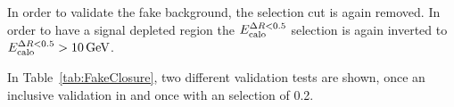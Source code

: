 In order to validate the fake background, the \nhits selection cut is again removed.
In order to have a signal depleted region the $E^{\Delta R<0.5}_{\text{calo}}$ selection is again inverted to $\ecalo>10\gev$.

In Table~\ref{tab:FakeClosure}, two different validation tests are shown, once an inclusive validation in \ias and once with an \ias selection of 0.2.

\renewcommand{\arraystretch}{1.4}
\begin{table}[!h]
\centering
\caption{Validation test of leptonic background estimation. Left: $\ecalo>10\gev$ and $\nhits>6$. Right: $\ecalo>10\gev$, $\nhits>6$ and $\ias>0.2$}
\label{tab:FakeClosure}
\end{table}
